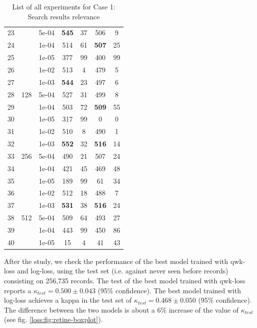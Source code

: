 \begin{table}[h!]
{\begin{tabular}{c|c|c|c|c|c|c}
			23 &                     & 5e-04 & \textbf{545} & 37 & 506 & 9\\
			24 &                     & 1e-04 & 514 & 61 & \textbf{507} & 25\\
			25 &                     & 1e-05 & 377 & 99 & 400 & 99\\
			\hline	
			26 & \multirow{5}{*}{128} & 1e-02 & 513 & 4 & 479 & 5\\
			27 &                      & 1e-03 & \textbf{544} & 23 & 497 & 6\\
			28 &                      & 5e-04 & 527 & 31 & 499 & 8\\
			29 &                      & 1e-04 & 503 & 72 & \textbf{509} & 55\\
			30 &                      & 1e-05 & 317 & 99 &   0 & 0\\
			\hline	
			31 & \multirow{5}{*}{256} & 1e-02 & 510 & 8 & 490 & 1\\
			32 &                      & 1e-03 & \textbf{552} & 32 & \textbf{516} & 14\\
			33 &                      & 5e-04 & 490 & 21 & 507 & 24\\
			34 &                      & 1e-04 & 421 & 45 & 469 & 48\\
			35 &                      & 1e-05 & 189 & 99 & 61 & 34\\
			\hline	
			36 & \multirow{5}{*}{512} & 1e-02 & 512 & 18 & 488 & 7\\
			37 &                      & 1e-03 & \textbf{531} & 38 & \textbf{516} & 24\\
			38 &                      & 5e-04 & 509 & 64 & 493 & 27\\
			39 &                      & 1e-04 & 443 & 99 & 450 & 86\\
			40 &                      & 1e-05 & 15 & 4 & 41 & 43\\
			\hline			
		\end{tabular}
	}
	\caption[Search results relevance experiments]{List of all experiments for Case 1: Search results relevance}
	\label{loss:tab:crowdflower}
\end{table}

After the study, we check the performance of the best model trained with qwk-loss and log-loss, using the test set (i.e. against never seen before records) consisting on 256,735 records. The test of the best model trained with qwk-loss reports a $\kappa_{test} = 0.500 \pm 0.043$ (95\% confidence). The best model trained with log-loss achieves a kappa in the test set of $\kappa_{test} = 0.468 \pm 0.050$ (95\% confidence). The difference between the two models is about a 6\% increase of the value of $\kappa_{test}$ (see fig. \ref{loss:fig:retine-boxplot}).


